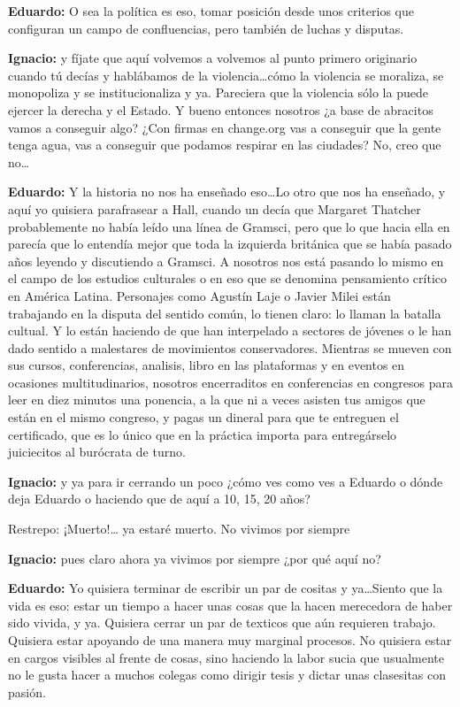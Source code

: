 \documentclass[
]{interact}
\begin{document}
\textbf{Eduardo:} O sea la política es eso, tomar posición desde unos
criterios que configuran un campo de confluencias, pero también de
luchas y disputas.

\textbf{Ignacio:} y fíjate que aquí volvemos a volvemos al punto primero
originario cuando tú decías y hablábamos de la violencia\ldots cómo la
violencia se moraliza, se monopoliza y se institucionaliza y ya.
Pareciera que la violencia sólo la puede ejercer la derecha y el Estado.
Y bueno entonces nosotros ¿a base de abracitos vamos a conseguir algo?
¿Con firmas en change.org vas a conseguir que la gente tenga agua, vas a
conseguir que podamos respirar en las ciudades? No, creo que no\ldots{}

\textbf{Eduardo:} Y la historia no nos ha enseñado eso\ldots Lo otro que
nos ha enseñado, y aquí yo quisiera parafrasear a Hall, cuando un decía
que Margaret Thatcher probablemente no había leído una línea de Gramsci,
pero que lo que hacia ella en parecía que lo entendía mejor que toda la
izquierda británica que se había pasado años leyendo y discutiendo a
Gramsci. A nosotros nos está pasando lo mismo en el campo de los
estudios culturales o en eso que se denomina pensamiento crítico en
América Latina. Personajes como Agustín Laje o Javier Milei están
trabajando en la disputa del sentido común, lo tienen claro: lo llaman
la batalla cultual. Y lo están haciendo de que han interpelado a
sectores de jóvenes o le han dado sentido a malestares de movimientos
conservadores. Mientras se mueven con sus cursos, conferencias,
analisis, libro en las plataformas y en eventos en ocasiones
multitudinarios, nosotros encerraditos en conferencias en congresos para
leer en diez minutos una ponencia, a la que ni a veces asisten tus
amigos que están en el mismo congreso, y pagas un dineral para que te
entreguen el certificado, que es lo único que en la práctica importa
para entregárselo juiciecitos al burócrata de turno.

\textbf{Ignacio:} y ya para ir cerrando un poco ¿cómo ves como ves a
Eduardo o dónde deja Eduardo o haciendo que de aquí a 10, 15, 20 años?

Restrepo: ¡Muerto!\ldots{} ya estaré muerto. No vivimos por siempre

\textbf{Ignacio:} pues claro ahora ya vivimos por siempre ¿por qué aquí
no?

\textbf{Eduardo:} Yo quisiera terminar de escribir un par de cositas y
ya\ldots Siento que la vida es eso: estar un tiempo a hacer unas cosas
que la hacen merecedora de haber sido vivida, y ya. Quisiera cerrar un
par de texticos que aún requieren trabajo. Quisiera estar apoyando de
una manera muy marginal procesos. No quisiera estar en cargos visibles
al frente de cosas, sino haciendo la labor sucia que usualmente no le
gusta hacer a muchos colegas como dirigir tesis y dictar unas clasesitas
con pasión.
\end{document}
